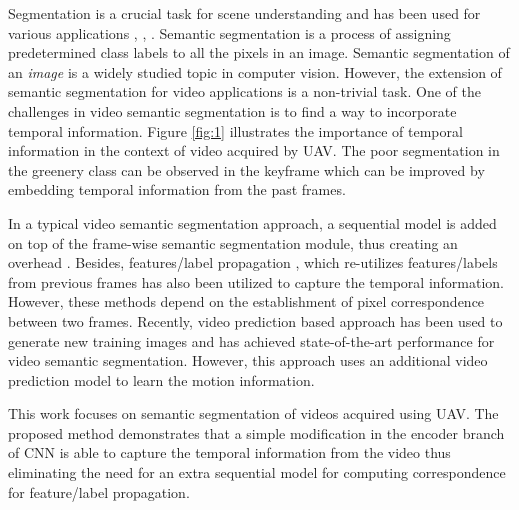 \documentclass[journal]{IEEEtran}
\begin{document}
\par Segmentation is a crucial task for scene understanding and has been used for various applications \cite{18}, \cite{2}, \cite{Ujjwal-Seg1}. Semantic segmentation is a process of assigning predetermined class labels to all the pixels in an image. Semantic segmentation of an \textit{image} is a widely studied topic in computer vision. However, the extension of semantic segmentation for video applications is a non-trivial task. One of the challenges in video semantic segmentation is to find a way to incorporate temporal information. Figure \ref{fig:1} illustrates the importance of temporal information in the context of video acquired by UAV. The poor segmentation in the greenery class can be observed in the  keyframe which can be improved by embedding temporal information from the past frames. 

\par In a typical video semantic segmentation approach, a sequential model is added on top of the frame-wise semantic segmentation module, thus creating an overhead \cite{13}. Besides, features/label propagation \cite{7}, which re-utilizes features/labels from previous frames has also been utilized to capture the temporal information. However, these methods depend on the establishment of pixel correspondence between two frames. Recently, video prediction based approach \cite{22} has been used to generate new training images and has achieved state-of-the-art performance for video semantic segmentation. However, this approach uses an additional video prediction model to learn the motion information. 

\par This work focuses on semantic segmentation of videos acquired using UAV. The proposed method demonstrates that a simple modification in the encoder branch of CNN is able to capture the temporal information from the video thus eliminating the need for an extra sequential model for computing correspondence for feature/label propagation. 
\end{document}
